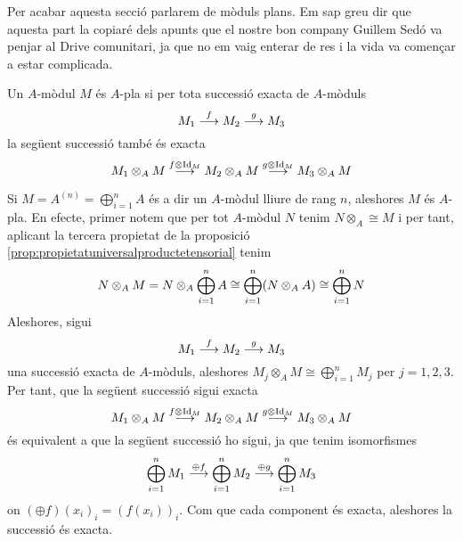 \documentclass[../../../main.tex]{subfiles}
\begin{document}
Per acabar aquesta secció parlarem de mòduls plans. Em sap greu dir que aquesta part la copiaré dels apunts que el nostre bon company Guillem Sedó va penjar al Drive comunitari, ja que no em vaig enterar de res i la vida va començar a estar complicada. 

\begin{defi}
[Pla]\label{def:modulPla} Un $A$-mòdul $M$ és $A$-pla si per tota successió exacta de $A$-mòduls
\begin{equation}
    \notag
    M_1\overset{f}{\longrightarrow}M_2\overset{g}{\longrightarrow}M_3
\end{equation}
la següent successió també és exacta
\begin{equation}
    \notag
    M_1\otimes_AM\overset{f\otimes\operatorname{Id}_M}{\longrightarrow}M_2\otimes_AM\overset{g\otimes\operatorname{Id}_M}{\longrightarrow}M_3\otimes_AM
\end{equation}
\end{defi}


\begin{ej}
Si $M = A^(n) = \bigoplus_{i=1}^n A$ és a dir un $A$-mòdul lliure de rang $n$, aleshores $M$ és $A$-pla. En efecte, primer notem que per tot $A$-mòdul $N$ tenim $N\otimes_A\cong M$ i per tant, aplicant la tercera propietat de la proposició \ref{prop:propietatuniversalproductetensorial} tenim
\begin{equation}
    \notag
    N\otimes_AM = N\otimes_A\bigoplus_{i=1}^nA\cong\bigoplus_{i=1}^n(N\otimes_AA)\cong\bigoplus_{i=1}^nN
\end{equation}
Aleshores, sigui
\begin{equation}
    \notag
    M_1\overset{f}{\longrightarrow}M_2\overset{g}{\longrightarrow}M_3
\end{equation}
una successió exacta de $A$-mòduls, aleshores $M_j\otimes_AM\cong\bigoplus_{i=1}^nM_j$ per $j = 1,2,3$. Per tant, que la següent successió sigui exacta
\begin{equation}
    \notag
    M_1\otimes_AM\overset{f\otimes\operatorname{Id}_M}{\longrightarrow}M_2\otimes_AM\overset{g\otimes\operatorname{Id}_M}{\longrightarrow}M_3\otimes_AM
\end{equation}
és equivalent a que la següent successió ho sigui, ja que tenim isomorfismes
\begin{equation}
    \notag
    \bigoplus_{i=1}^nM_1\overset{\oplus f}{\longrightarrow}\bigoplus_{i=1}^nM_2\overset{\oplus g}{\longrightarrow}\bigoplus_{i=1}^nM_3
\end{equation}
on $(\oplus f)(x_i)_i = (f(x_i))_i$. Com que cada component és exacta, aleshores la successió és exacta.
\end{ej}
\end{document}
